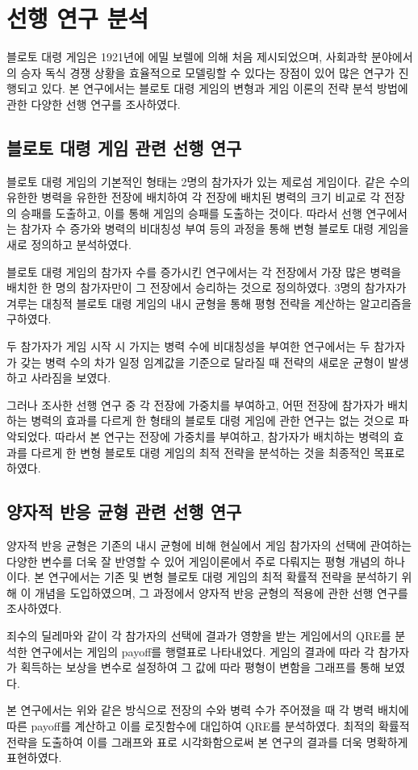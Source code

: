 \section{선행 연구 분석}
블로토 대령 게임은 1921년에 에밀 보렐에 의해 처음 제시되었으며, \cite{borel1953theory} 사회과학 분야에서의 승자 독식 경쟁 상황을 효율적으로 모델링할 수 있다는 장점이 있어 많은 연구가 진행되고 있다. 본 연구에서는 블로토 대령 게임의 변형과 게임 이론의 전략 분석 방법에 관한 다양한 선행 연구를 조사하였다.

\subsection{블로토 대령 게임 관련 선행 연구}
블로토 대령 게임의 기본적인 형태는 2명의 참가자가 있는 제로섬 게임이다. 같은 수의 유한한 병력을 유한한 전장에 배치하여 각 전장에 배치된 병력의 크기 비교로 각 전장의 승패를 도출하고, 이를 통해 게임의 승패를 도출하는 것이다. 따라서 선행 연구에서는 참가자 수 증가와 병력의 비대칭성 부여 등의 과정을 통해 변형 블로토 대령 게임을 새로 정의하고 분석하였다.

블로토 대령 게임의 참가자 수를 증가시킨 연구에서는 각 전장에서 가장 많은 병력을 배치한 한 명의 참가자만이 그 전장에서 승리하는 것으로 정의하였다. 3명의 참가자가 겨루는 대칭적 블로토 대령 게임의 내시 균형을 통해 평형 전략을 계산하는 알고리즘을 구하였다. \cite{boix2020multiplayer}

두 참가자가 게임 시작 시 가지는 병력 수에 비대칭성을 부여한 연구에서는 두 참가자가 갖는 병력 수의 차가 일정 임계값을 기준으로 달라질 때 전략의 새로운 균형이 발생하고 사라짐을 보였다. \cite{roberson2012non}

그러나 조사한 선행 연구 중 각 전장에 가중치를 부여하고, 어떤 전장에 참가자가 배치하는 병력의 효과를 다르게 한 형태의 블로토 대령 게임에 관한 연구는 없는 것으로 파악되었다. 따라서 본 연구는 전장에 가중치를 부여하고, 참가자가 배치하는 병력의 효과를 다르게 한 변형 블로토 대령 게임의 최적 전략을 분석하는 것을 최종적인 목표로 하였다.

\subsection{양자적 반응 균형 관련 선행 연구}

양자적 반응 균형은 기존의 내시 균형에 비해 현실에서 게임 참가자의 선택에 관여하는 다양한 변수를 더욱 잘 반영할 수 있어 게임이론에서 주로 다뤄지는 평형 개념의 하나이다. 본 연구에서는 기존 및 변형 블로토 대령 게임의 최적 확률적 전략을 분석하기 위해 이 개념을 도입하였으며, 그 과정에서 양자적 반응 균형의 적용에 관한 선행 연구를 조사하였다.

죄수의 딜레마와 같이 각 참가자의 선택에 결과가 영향을 받는 게임에서의 QRE를 분석한 연구에서는 게임의 payoff를 행렬표로 나타내었다. 게임의 결과에 따라 각 참가자가 획득하는 보상을 변수로 설정하여 그 값에 따라 평형이 변함을 그래프를 통해 보였다. \cite{mckelvey1995quantal}

본 연구에서는 위와 같은 방식으로 전장의 수와 병력 수가 주어졌을 때 각 병력 배치에 따른 payoff를 계산하고 이를 로짓함수에 대입하여 QRE를 분석하였다. 최적의 확률적 전략을 도출하여 이를 그래프와 표로 시각화함으로써 본 연구의 결과를 더욱 명확하게 표현하였다.